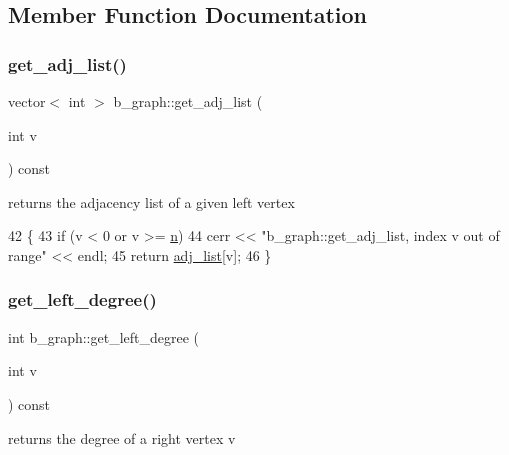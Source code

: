 \subsection{Member Function Documentation}
\mbox{\label{classb__graph_aa81c7179b9c6cb4986c4b41e84a85799}} 
\subsubsection{\texorpdfstring{get\+\_\+adj\+\_\+list()}{get\_adj\_list()}}
{\footnotesize\ttfamily vector$<$ int $>$ b\+\_\+graph\+::get\+\_\+adj\+\_\+list (\begin{DoxyParamCaption}\item[{int}]{v }\end{DoxyParamCaption}) const}



returns the adjacency list of a given left vertex 


\begin{DoxyCode}
42 \{
43   \textcolor{keywordflow}{if} (v < 0 or v >= \hyperlink{classb__graph_a9e211d40c1799bc9b125de472ff06642}{n})
44     cerr << \textcolor{stringliteral}{"b\_graph::get\_adj\_list, index v out of range"} << endl;
45   \textcolor{keywordflow}{return} \hyperlink{classb__graph_a2a89d2e8f958270952aab2e8769b7342}{adj\_list}[v];
46 \}
\end{DoxyCode}
\mbox{\label{classb__graph_ac64ac5cb1197d8008e07babc333eb3ea}} 
\subsubsection{\texorpdfstring{get\+\_\+left\+\_\+degree()}{get\_left\_degree()}}
{\footnotesize\ttfamily int b\+\_\+graph\+::get\+\_\+left\+\_\+degree (\begin{DoxyParamCaption}\item[{int}]{v }\end{DoxyParamCaption}) const}



returns the degree of a right vertex v 


